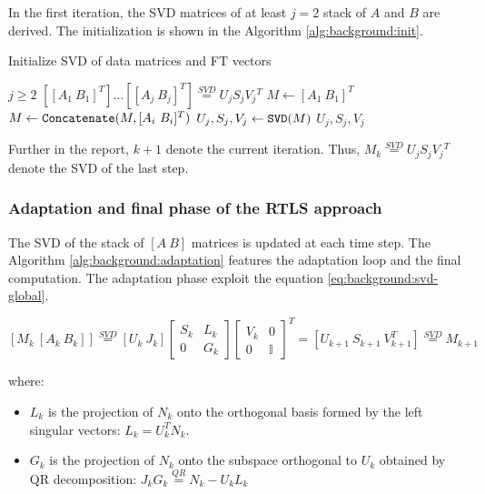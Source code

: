 \documentclass[/home/francois/latex/report/main.tex]{subfiles}
\begin{document}
In the first iteration, the \ac{SVD} matrices of at least $j=2$ stack of $A$ and $B$ are derived. The initialization is shown in the Algorithm \ref{alg:background:init}.

\begin{algorithm}
\caption{Initialize \ac{SVD} of data matrices and \ac{FT} vectors\label{alg:background:init}}
\begin{algorithmic}
\REQUIRE $j \geq 2$
\ENSURE $[[A_1 \ B_1]^T] \ldots [[A_j \ B_j]^T] \overset{SVD}{=} U_j S_j V_j {}^T$
\STATE $M \leftarrow [A_1 \ B_1]^T$
 \STATE $M \leftarrow \text{\texttt{Concatenate}}(M, [A_i \ B_i]^T)$
\ENDFOR
\STATE $U_j, S_j, V_j \leftarrow \text{\texttt{SVD}}(M)$
\RETURN $U_j, S_j, V_j$
\end{algorithmic}
\end{algorithm}

Further in the report, $k+1$ denote the current iteration. Thus, $M_k \overset{SVD}{=} U_j S_j V_j {}^T$ denote the \ac{SVD} of the last step.

\subsubsection{Adaptation and final phase of the \ac{RTLS} approach}

The \ac{SVD} of the stack of $[A \ B]$ matrices is updated at each time step. The Algorithm \ref{alg:background:adaptation} features the adaptation loop and the final computation. The adaptation phase exploit the equation \ref{eq:background:svd-global}.

\begin{equation}
  \label{eq:background:svd-global}
  [M_k \ [A_k \ B_k]] \overset{SVD}{=} [U_k \ J_k]
  \begin{bmatrix}
  S_k &  L_k \\
  0 & G_k
\end{bmatrix}
  \begin{bmatrix}
  V_k &  0 \\
  0 & \mathbb{I}
\end{bmatrix}^T = [U_{k+1} \ S_{k+1} \ V_{k+1}^T]
 \overset{SVD}{=} M_{k+1}
\end{equation}

where:
\begin{itemize}
  \item $L_k$ is the projection of $N_k$ onto the orthogonal basis formed by the left singular vectors: $L_k = U_k^T N_k$.
  \item $G_k$ is the projection of $N_k$ onto the subspace orthogonal to $U_k$ obtained by QR decomposition: $J_k G_k \overset{QR}{=} N_k - U_k L_k$
\end{itemize}
\end{document}
